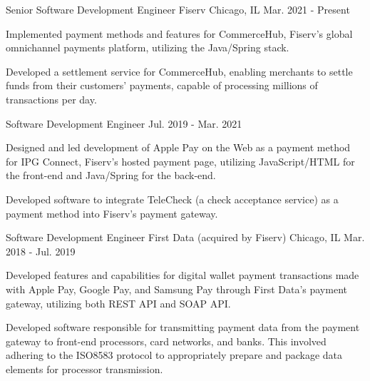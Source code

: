 
\begin{cventries}

    \cventry
    {Senior Software Development Engineer} %
    {Fiserv} %
    {Chicago, IL} %
    {Mar. 2021 - Present} %
    {
        \begin{cvitems} %
            \item {Implemented payment methods and features for CommerceHub, Fiserv’s global omnichannel payments platform, utilizing the Java/Spring stack.}
            \item {Developed a settlement service for CommerceHub, enabling merchants to settle funds from their customers' payments, capable of processing millions of transactions per day.}
        \end{cvitems}
    }
    \cventry
    {Software Development Engineer} %
    {} %
    {} %
    {Jul. 2019 - Mar. 2021} %
    {
        \begin{cvitems} %
            \item {Designed and led development of Apple Pay on the Web as a payment method for IPG Connect, Fiserv's hosted payment page, utilizing JavaScript/HTML for the front-end and Java/Spring for the back-end.}
            \item {Developed software to integrate TeleCheck (a check acceptance service) as a payment method into Fiserv's payment gateway.}
        \end{cvitems}
    }


    \cventry
    {Software Development Engineer} %
    {First Data (acquired by Fiserv)} %
    {Chicago, IL} %
    {Mar. 2018 - Jul. 2019} %
    {
        \begin{cvitems} %
            \item {Developed features and capabilities for digital wallet payment transactions made with Apple Pay, Google Pay, and Samsung Pay through First Data's payment gateway, utilizing both REST API and SOAP API.}
            \item {Developed software responsible for transmitting payment data from the payment gateway to front-end processors, card networks, and banks. This involved adhering to the ISO8583 protocol to appropriately prepare and package data elements for processor transmission.}
        \end{cvitems}
    }


\end{cventries}
